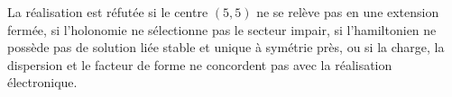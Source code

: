 \begin{criterion}
\label{crit:cierre-electronico}
La réalisation est réfutée si le centre \((5,5)\) ne se relève pas en une
extension fermée, si l'holonomie ne sélectionne pas le secteur impair, si
l'hamiltonien ne possède pas de solution liée stable et unique à symétrie près, ou
si la charge, la dispersion et le facteur de forme ne concordent pas avec la réalisation
électronique.
\end{criterion}
